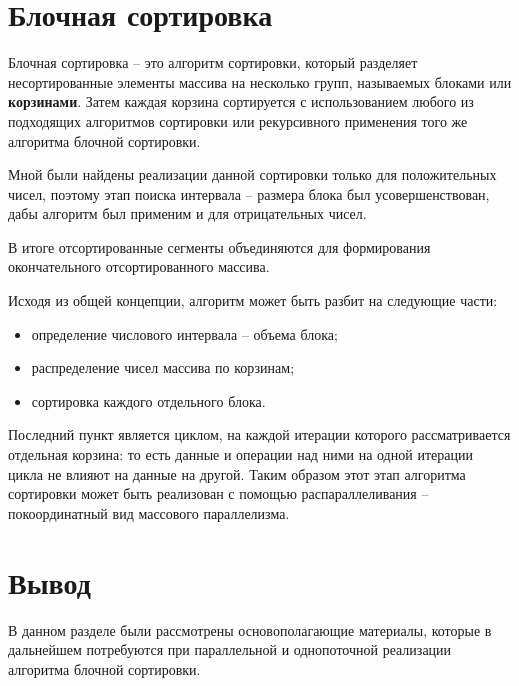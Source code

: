 \section{Блочная сортировка}

Блочная сортировка \cite{bucket} -- это алгоритм сортировки, который разделяет несортированные элементы массива на несколько групп, называемых блоками или \textbf{корзинами}. 
Затем каждая корзина сортируется с использованием любого из подходящих алгоритмов сортировки или рекурсивного применения того же алгоритма блочной сортировки. 

Мной были найдены реализации данной сортировки только для положительных чисел, поэтому этап поиска интервала -- размера блока был усовершенствован, дабы алгоритм был применим и для отрицательных чисел. 

В итоге отсортированные сегменты объединяются для формирования окончательного отсортированного массива.

Исходя из общей концепции, алгоритм может быть разбит на следующие части: 
\begin{itemize}
	\item определение числового интервала -- объема блока;
	\item распределение чисел массива по корзинам;
	\item сортировка каждого отдельного блока.
\end{itemize}

Последний пункт является циклом, на каждой итерации которого рассматривается отдельная корзина: то есть данные и операции над ними на одной итерации цикла не влияют на данные на другой. 
Таким образом этот этап алгоритма сортировки может быть реализован с помощью распараллеливания -- покоординатный вид массового параллелизма. 

\section{Вывод}

В данном разделе были рассмотрены основополагающие материалы, которые в дальнейшем потребуются при параллельной и однопоточной реализации алгоритма блочной сортировки.

